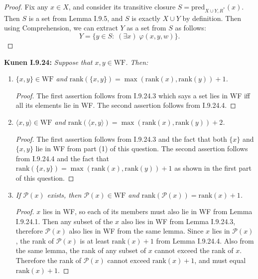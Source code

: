 \documentclass{article}
\begin{document}
\begin{proof}
    Fix any $x\in X$, and consider its transitive closure
    $S=\text{pred}_{X\cup Y,R^*}(x)$. Then $S$ is a set from Lemma I.9.5,
    and $S$ is exactly $X\cup Y$ by definition. Then using Comprehension,
    we can extract $Y$ as a set from $S$ as follows:
    \[Y =\{y\in S:\; (\exists x)\; \varphi(x,y,w)\}.\]
  \end{proof}

\textbf{Kunen I.9.24:} \it Suppose that $x,y\in\text{WF}$. Then:
  \begin{enumerate}
    \item \it $\{x,y\}\in\text{WF}$ and $\text{rank}(\{x,y\})
      =\max(\text{rank}(x), \text{rank}(y))+1$.

      \begin{proof}
        The first assertion follows from I.9.24.3 which says a set lies in
        WF iff all its elements lie in WF. The second assertion follows
        from I.9.24.4.
      \end{proof}

    \item \it $\langle x,y\rangle\in\text{WF}$ and $\text{rank}(\langle
      x,y\rangle) =\max(\text{rank}(x), \text{rank}(y))+2$.

      \begin{proof}
        The first assertion follows from I.9.24.3 and the fact that both
        $\{x\}$ and $\{x,y\}$ lie in WF from part (1) of this question.
        The second assertion follows from I.9.24.4 and the fact that
        $\text{rank}(\{x,y\}) =\max(\text{rank}(x), \text{rank}(y))+1$ as
        shown in the first part of this question.
      \end{proof}

    \item \it If $\mathcal{P}(x)$ exists, then $\mathcal{P}(x)\in\text{WF}$
      and $\text{rank}(\mathcal{P}(x)) =\text{rank}(x)+1$.

      \begin{proof}
        $x$ lies in WF, so each of its members must also lie in WF from
        Lemma I.9.24.1. Then any subset of the $x$ also lies in WF from
        Lemma I.9.24.3, therefore $\mathcal{P}(x)$ also lies in WF from the
        same lemma. Since $x$ lies in $\mathcal{P}(x)$, the rank of
        $\mathcal{P}(x)$ is at least $\text{rank}(x)+1$ from Lemma
        I.9.24.4. Also from the same lemma, the rank of any subset of $x$
        cannot exceed the rank of $x$. Therefore the rank of
        $\mathcal{P}(x)$ cannot exceed $\text{rank}(x)+1$, and must equal
        $\text{rank}(x)+1$.
      \end{proof}


\end{enumerate}
\end{document}
